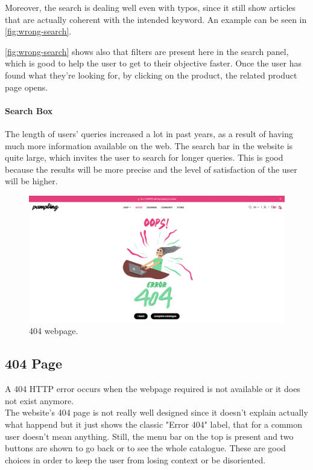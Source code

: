 Moreover, the search is dealing well even with typos, since it still show articles that are actually coherent with the 
intended keyword. An example can be seen in \cref{fig:wrong-search}.

\cref{fig:wrong-search} shows also that filters are present here in the search panel, which is good to 
help the user to get to their objective faster.
Once the user has found what they're looking for, by clicking on the product, the related product page opens.

\paragraph{Search Box}
The length of users' queries increased a lot in past years, as a result of having much more information available on the web.
The search bar in the website is quite large, which invites the user to search for longer queries. This is good because 
the results will be more precise and the level of satisfaction of the user will be higher. 

\begin{figure}[h!]
	\centering
	\includegraphics[scale=0.225]{images/404.png}
	\caption{404 webpage.}
	\label{fig:404}
\end{figure}
\subsection{404 Page}

A 404 HTTP error occurs when the webpage required is not available or it does not exist anymore. \\
The website's 404 page is not really well designed since it doesn't explain actually what happend but it just shows the
classic "Error 404" label, that for a common user doesn't mean anything.
Still, the menu bar on the top is present and two buttons are shown to go back or to see the whole catalogue.
These are good choices in order to keep the user from losing context or be disoriented.


